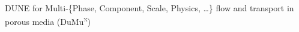 \begin{frame}
\begin{alertblock}{DUNE for Multi-\{Phase, Component, Scale, Physics, \ldots\} flow and transport in porous media (DuMu\textsuperscript{x})}
\begin{itemize}





		\end{itemize}
	\end{alertblock}


\end{frame}

